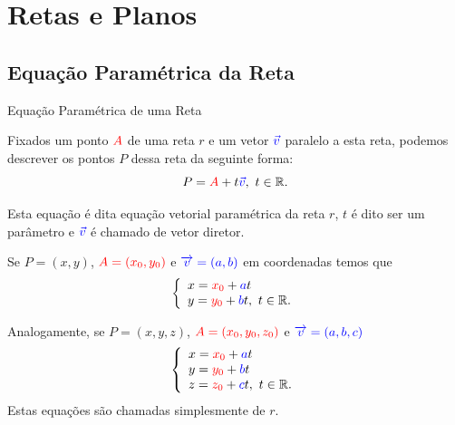 \section{Retas e Planos}

\subsection*{Equação Paramétrica da Reta}


\begin{frame}[label=retas]{Equação Paramétrica de uma Reta}

Fixados um ponto ${\color{red} A}$ de uma reta $r$ e um vetor ${\color{blue}\vec{v}}$ paralelo a esta reta, podemos descrever os pontos $P$ dessa reta da seguinte forma:
\[P={\color{red}A}+t{\color{blue}\vec{v}},\ t\in \mathbb{R}.\]
	\begin{center}
	\end{center}
	
Esta equação é dita {\color{blue} equação vetorial paramétrica da reta $r$}, $t$ é dito ser um {\color{blue}parâmetro} e ${\color{blue}\vec{v}}$ é chamado de {\color{blue}vetor diretor.}

\end{frame}

\begin{frame}[label=retas]
Se	$P=(x,y)$, $\textcolor{red}{A=(x_0,y_0)}$ e $\textcolor{blue}{\overrightarrow{v}=(a,b)}$
em coordenadas temos que
\[	\left\{\begin{array}{l}
	x=\textcolor{red}{x_0}+\textcolor{blue}{a}t\\
	y=\textcolor{red}{y_0}+\textcolor{blue}{b}t,\  t\in \mathbb{R}.
	\end{array}\right.\]


Analogamente, se 	$P=(x,y,z)$, $\textcolor{red}{A=(x_0,y_0,z_0)}$ e $\textcolor{blue}{\overrightarrow{v}=(a,b,c)}$
		\[	\left\{\begin{array}{l}
		x=\textcolor{red}{x_0}+\textcolor{blue}{a}t\\
		y=\textcolor{red}{y_0}+\textcolor{blue}{b}t\\
		z=\textcolor{red}{z_0}+\textcolor{blue}{c}t,\  t\in \mathbb{R}.
		\end{array}\right.\]
		Estas equações são chamadas simplesmente de  $r$.


\end{frame}

